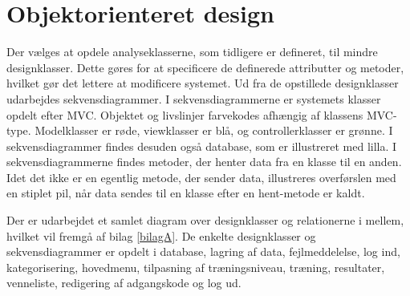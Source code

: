 \section{Objektorienteret design}
Der vælges at opdele analyseklasserne, som tidligere er defineret, til mindre designklasser. Dette gøres for at specificere de definerede attributter og metoder, hvilket gør det lettere at modificere systemet. Ud fra de opstillede designklasser udarbejdes sekvensdiagrammer. I sekvensdiagrammerne er systemets klasser opdelt efter MVC. Objektet og livslinjer farvekodes afhængig af klassens MVC-type. Modelklasser er røde, viewklasser er blå, og controllerklasser er grønne. I sekvensdiagrammer findes desuden også database, som er illustreret med lilla. I sekvensdiagrammerne findes metoder, der henter data fra en klasse til en anden. Idet det ikke er en egentlig metode, der sender data, illustreres overførslen med en stiplet pil, når data sendes til en klasse efter en hent-metode er kaldt. 

Der er udarbejdet et samlet diagram over designklasser og relationerne i mellem, hvilket vil fremgå af bilag \autoref{bilagA}. De enkelte designklasser og sekvensdiagrammer er opdelt i database, lagring af data, fejlmeddelelse, log ind, kategorisering, hovedmenu, tilpasning af træningsniveau, træning, resultater, venneliste, redigering af adgangskode og log ud. 
